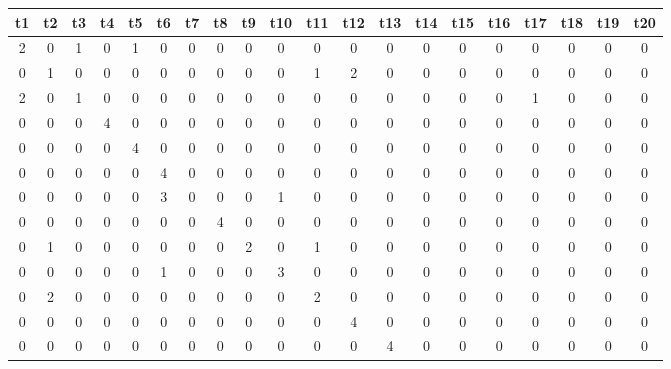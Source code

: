 \documentclass{IEEEtran}
\begin{document}
\begin{table}[h!]
\centering
\begin{tabular}{|c|c|c|c|c|c|c|c|c|c|c|c|c|c|c|c|c|c|c|c|}
\hline
\textbf{t1} & \textbf{t2} & \textbf{t3} & \textbf{t4} & \textbf{t5} & \textbf{t6} & \textbf{t7} & \textbf{t8} & \textbf{t9} & \textbf{t10} & \textbf{t11} & \textbf{t12} &
\textbf{t13} & \textbf{t14} & \textbf{t15} & \textbf{t16} & \textbf{t17} & \textbf{t18} &
\textbf{t19} & \textbf{t20} \\
\hline
\cellcolor{green!40}2 & 0 & \cellcolor{red!25}1 & 0 & \cellcolor{red!25}1 & 0 & 0 & 0 & 0 & 0 & 0 & 0 & 0 & 0 & 0 & 0 & 0 & 0 & 0 & 0\\
\hline
0 & \cellcolor{green!40}1 & 0 & 0 & 0 & 0 & 0 & 0 & 0 & 0 & \cellcolor{red!25}1 & \cellcolor{red!25}2 & 0 & 0 & 0 & 0 & 0 & 0 & 0 & 0\\
\hline
2 & 0 & \cellcolor{green!40}1 & 0 & 0 & 0 & 0 & 0 & 0 & 0 & 0 & 0 & 0 & 0 & 0 & 0 & \cellcolor{red!25}1 & 0 & 0 & 0\\
\hline
0 & 0 & 0 & \cellcolor{green!40}4 & 0 & 0 & 0 & 0 & 0 & 0 & 0 & 0 & 0 & 0 & 0 & 0 & 0 & 0 & 0 & 0\\
\hline
0 & 0 & 0 & 0 & \cellcolor{green!40}4 & 0 & 0 & 0 & 0 & 0 & 0 & 0 & 0 & 0 & 0 & 0 & 0 & 0 & 0 & 0\\
\hline
0 & 0 & 0 & 0 & 0 & \cellcolor{green!40}4 & 0 & 0 & 0 & 0 & 0 & 0 & 0 & 0 & 0 & 0 & 0 & 0 & 0 & 0\\
\hline
0 & 0 & 0 & 0 & 0 & \cellcolor{red!25}3 & \cellcolor{green!40}0 & 0 & 0 & \cellcolor{red!25}1 & 0 & 0 & 0 & 0 & 0 & 0 & 0 & 0 & 0 & 0\\
\hline
0 & 0 & 0 & 0 & 0 & 0 & 0 & \cellcolor{green!40}4 & 0 & 0 & 0 & 0 & 0 & 0 & 0 & 0 & 0 & 0 & 0 & 0\\
\hline
0 & \cellcolor{red!25}1 & 0 & 0 & 0 & 0 & 0 & 0 & \cellcolor{green!40}2 & 0 & \cellcolor{red!25}1 & 0 & 0 & 0 & 0 & 0 & 0 & 0 & 0 & 0\\
\hline
0 & 0 & 0 & 0 & 0 & \cellcolor{red!25}1 & 0 & 0 & 0 & \cellcolor{green!40}3 & 0 & 0 & 0 & 0 & 0 & 0 & 0 & 0 & 0 & 0\\
\hline
0 & \cellcolor{red!25}2 & 0 & 0 & 0 & 0 & 0 & 0 & 0 & 0 & \cellcolor{green!40}2 & 0 & 0 & 0 & 0 & 0 & 0 & 0 & 0 & 0\\
\hline
0 & 0 & 0 & 0 & 0 & 0 & 0 & 0 & 0 & 0 & 0 & \cellcolor{green!40}4 & 0 & 0 & 0 & 0 & 0 & 0 & 0 & 0\\
\hline
0 & 0 & 0 & 0 & 0 & 0 & 0 & 0 & 0 & 0 & 0 & 0 & \cellcolor{green!40}4 & 0 & 0 & 0 & 0 & 0 & 0 & 0\\

\end{tabular}
\end{table}
\end{document}
